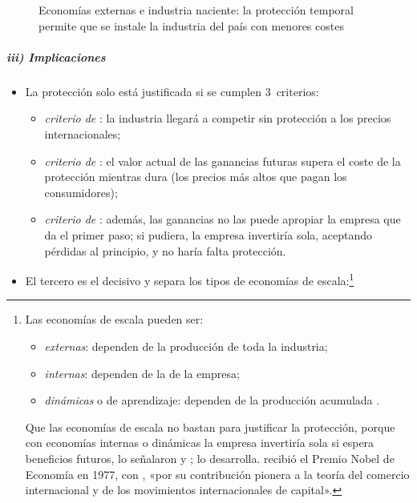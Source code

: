 \documentclass[11pt]{article}
\begin{document}
\begin{figure}[H]
\centering
\caption{Economías externas e industria naciente: la protección temporal permite que se instale la industria del país con menores costes}\label{fig:industria-naciente}
\end{figure}


\subparagraph{iii) Implicaciones}

\begin{itemize}
\item La protección solo está justificada si se cumplen 3~criterios\nocite{Kemp1960Mill}:
  \begin{itemize}
  \item \emph{criterio de }: la industria llegará a competir sin protección a los precios internacionales;
  \item \emph{criterio de }: el valor actual de las ganancias futuras supera el coste de la protección mientras dura (los precios más altos que pagan los consumidores);
  \item \emph{criterio de }: además, las ganancias no las puede apropiar la empresa que da el primer paso; si pudiera, la empresa invertiría sola, aceptando pérdidas al principio, y no haría falta protección.
  \end{itemize}
\item El tercero es el decisivo y separa los tipos de economías de escala:\footnote{Las economías de escala pueden ser:
\begin{itemize}
\item \emph{externas}: dependen de la producción de toda la industria;
\item \emph{internas}: dependen de la de la empresa;
\item \emph{dinámicas} o de aprendizaje: dependen de la producción acumulada .
\end{itemize}
Que las economías de escala no bastan para justificar la protección, porque con economías internas o dinámicas la empresa invertiría sola si espera beneficios futuros, lo señalaron \textcite{Meade1955Trade} y \textcite{Kemp1960Mill}; \textcite{Baldwin1969Case} lo desarrolla.  recibió el Premio Nobel de Economía en 1977, con , «por su contribución pionera a la teoría del comercio internacional y de los movimientos internacionales de capital»\nocite{Nobel1977MeadeOhlin}.}

\end{itemize}
\end{document}
